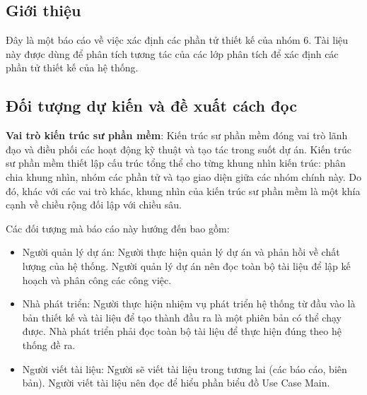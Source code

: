 \documentclass[./../main.tex]{subfiles}
\begin{document}
\subsection{Giới thiệu}

Đây là một báo cáo về việc xác định các phần tử thiết kế của nhóm 6.
Tài liệu này được dùng để phân tích tương tác của các lớp phân tích để xác định các phần tử thiết kế của hệ thống.

\subsection{Đối tượng dự kiến và đề xuất cách đọc}

\textbf{Vai trò kiến trúc sư phần mềm}: Kiến trúc sư phần mềm đóng vai trò lãnh đạo và điều phối các hoạt động kỹ thuật và tạo tác trong suốt dự án. Kiến trúc sư phần mềm thiết lập cấu trúc tổng thể cho từng khung nhìn kiến trúc: phân chia khung nhìn, nhóm các phần tử và tạo giao diện giữa các nhóm chính này. Do đó, khác với các vai trò khác, khung nhìn của kiến trúc sư phần mềm là một khía cạnh về chiều rộng đối lập với chiều sâu.

Các đối tượng mà báo cáo này hướng đến bao gồm:
\begin{itemize}
	\item Người quản lý dự án: Người thực hiện quản lý dự án và phản hồi về chất lượng của hệ thống. Người quản lý dự án nên đọc toàn bộ tài liệu để lập kế hoạch và phân công các công việc.
	\item Nhà phát triển: Người thực hiện nhiệm vụ phát triển hệ thống từ đầu vào là bản thiết kế và tài liệu để tạo thành đầu ra là một phiên bản có thể chạy được. Nhà phát triển phải đọc toàn bộ tài liệu để thực hiện đúng theo hệ thống đề ra.
\item Người viết tài liệu: Người sẽ viết tài liệu trong tương lai (các báo cáo, biên bản). Người viết tài liệu nên đọc để hiểu phần biểu đồ Use Case Main.
\end{itemize}
\end{document}
